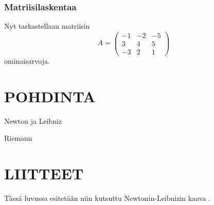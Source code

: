 \subsubsection{Matriisilaskentaa}

Nyt tarkastellaan matriisin
\[
A=\left(\begin{array}{rrr} -1 & -2 & -5\\ 3& 4& 5\\ -3 & 2 & 1 \end{array}\right)
\]
ominaisarvoja.


\section{POHDINTA}
\lipsum[1]
\vspace{0.7cm}
\lipsum[1]



 
\begin{thebibliography}{99}

 Newton ja Leibniz

 Riemann

\end{thebibliography}


\section{LIITTEET}

Tässä luvussa esitetään niin kutsuttu Newtonin-Leibnizin kaava \cite{NewtLeib}.


